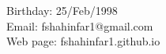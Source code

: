 {
\small
\noindent
\flushright
Birthday: 25/Feb/1998 \\
Email: fshahinfar1@gmail.com \\
Web page: fshahinfar1.github.io \\
}
